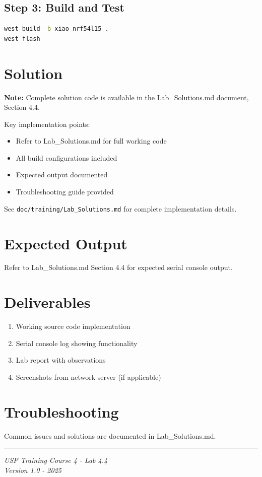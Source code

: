 \documentclass[11pt,a4paper]{article}
\begin{document}
\subsection{Step 3: Build and Test}
\begin{lstlisting}[language=bash]
west build -b xiao_nrf54l15 .
west flash
\end{lstlisting}

\section{Solution}

\begin{solutionbox}
\textbf{Note:} Complete solution code is available in the Lab\_Solutions.md document, Section 4.4.

Key implementation points:
\begin{itemize}
    \item Refer to Lab\_Solutions.md for full working code
    \item All build configurations included
    \item Expected output documented
    \item Troubleshooting guide provided
\end{itemize}

See \texttt{doc/training/Lab\_Solutions.md} for complete implementation details.
\end{solutionbox}

\section{Expected Output}

Refer to Lab\_Solutions.md Section 4.4 for expected serial console output.

\section{Deliverables}

\begin{enumerate}[itemsep=10pt]
    \item Working source code implementation
    \item Serial console log showing functionality
    \item Lab report with observations
    \item Screenshots from network server (if applicable)
\end{enumerate}

\section{Troubleshooting}

Common issues and solutions are documented in Lab\_Solutions.md.

\vfill
\noindent\rule{\textwidth}{0.4pt}
\begin{center}
\textit{USP Training Course 4 - Lab 4.4}\\
\textit{Version 1.0 - 2025}
\end{center}
\end{document}

